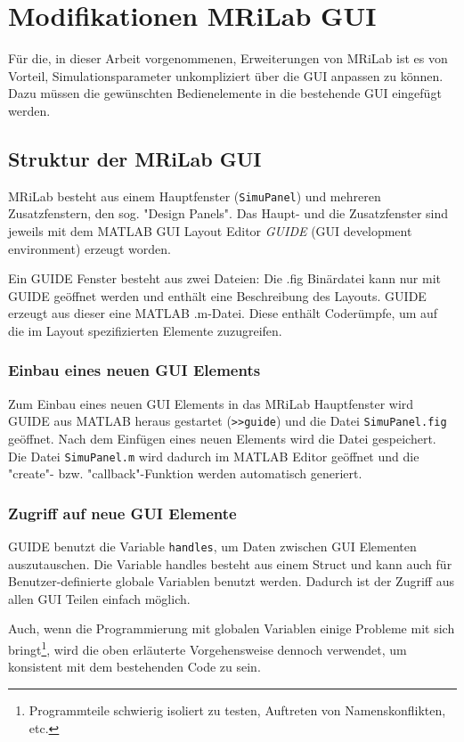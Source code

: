 \section{Modifikationen MRiLab GUI}
Für die, in dieser Arbeit vorgenommenen, Erweiterungen von MRiLab ist es von Vorteil, Simulationsparameter unkompliziert über die GUI anpassen zu können. Dazu müssen die gewünschten Bedienelemente in die bestehende GUI eingefügt werden.

\subsection{Struktur der MRiLab GUI}
MRiLab besteht aus einem Hauptfenster (\texttt{SimuPanel}) und mehreren Zusatzfenstern, den sog. "Design Panels". Das Haupt- und die Zusatzfenster sind jeweils mit dem MATLAB GUI Layout Editor \textit{GUIDE} (GUI development environment) erzeugt worden.

Ein GUIDE Fenster besteht aus zwei Dateien: Die .fig Binärdatei kann nur mit GUIDE geöffnet werden und enthält eine Beschreibung des Layouts. GUIDE erzeugt aus dieser eine MATLAB .m-Datei. Diese enthält Coderümpfe, um auf die im Layout spezifizierten Elemente zuzugreifen.

\subsubsection{Einbau eines neuen GUI Elements}
Zum Einbau eines neuen GUI Elements in das MRiLab Hauptfenster wird GUIDE aus MATLAB heraus gestartet (\texttt{>>guide}) und die Datei \texttt{SimuPanel.fig} geöffnet. Nach dem Einfügen eines neuen Elements wird die Datei gespeichert. Die Datei \texttt{SimuPanel.m} wird dadurch im MATLAB Editor geöffnet und die "create"- bzw. "callback"-Funktion werden automatisch generiert.

\subsubsection{Zugriff auf neue GUI Elemente}
GUIDE benutzt die Variable \texttt{handles}, um Daten zwischen GUI Elementen auszutauschen. Die Variable handles besteht aus einem Struct und kann auch für Benutzer-definierte globale Variablen benutzt werden. Dadurch ist der Zugriff aus allen GUI Teilen einfach möglich.

Auch, wenn die Programmierung mit globalen Variablen einige Probleme mit sich bringt\footnote{Programmteile schwierig isoliert zu testen, Auftreten von Namenskonflikten, etc.}, wird die oben erläuterte Vorgehensweise dennoch verwendet, um konsistent mit dem bestehenden Code zu sein.

